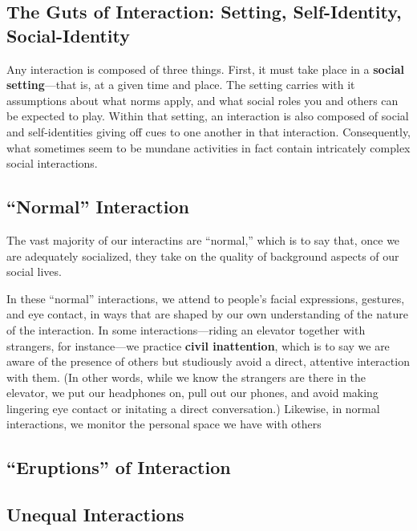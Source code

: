 \documentclass[
  letterpaper,
  DIV=11,
  numbers=noendperiod,
  oneside]{scrartcl}
\begin{document}
\subsection{The Guts of Interaction: Setting, Self-Identity,
Social-Identity}\label{the-guts-of-interaction-setting-self-identity-social-identity}

Any interaction is composed of three things. First, it must take place
in a \textbf{social setting}---that is, at a given time and place. The
setting carries with it assumptions about what norms apply, and what
social roles you and others can be expected to play. Within that
setting, an interaction is also composed of social and self-identities
giving off cues to one another in that interaction. Consequently, what
sometimes seem to be mundane activities in fact contain intricately
complex social interactions.

\subsection{``Normal'' Interaction}\label{normal-interaction}

The vast majority of our interactins are ``normal,'' which is to say
that, once we are adequately socialized, they take on the quality of
background aspects of our social lives.

In these ``normal'' interactions, we attend to people's facial
expressions, gestures, and eye contact, in ways that are shaped by our
own understanding of the nature of the interaction. In some
interactions---riding an elevator together with strangers, for
instance---we practice \textbf{civil inattention}, which is to say we
are aware of the presence of others but studiously avoid a direct,
attentive interaction with them. (In other words, while we know the
strangers are there in the elevator, we put our headphones on, pull out
our phones, and avoid making lingering eye contact or initating a direct
conversation.) Likewise, in normal interactions, we monitor the personal
space we have with others

\subsection{``Eruptions'' of
Interaction}\label{eruptions-of-interaction}

\subsection{Unequal Interactions}\label{unequal-interactions}
\end{document}
